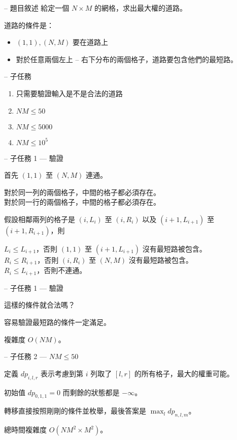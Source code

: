 \documentclass[hyperref,UTF8,notheorems,xcolor={dvipsnames}]{beamer}
\newcommand{\btitle}[1]{{\secname} -- #1}
\theoremstyle{definition}
\begin{document}
\begin{frame}[fragile]{\btitle{題目敘述}}
	給定一個 $N \times M$ 的網格，求出最大權的道路。  

	道路的條件是：
	\begin{itemize}
		\item $(1, 1), (N, M)$ 要在道路上
		\item 對於任意兩個左上 -- 右下分布的兩個格子，道路要包含他們的最短路。
	\end{itemize}
\end{frame}

\begin{frame}[fragile]{\btitle{子任務}}
	\begin{enumerate}
		\item 只需要驗證輸入是不是合法的道路
		\item $NM \leq 50$
		\item $NM \leq 5000$
		\item $NM \leq 10^5$
	\end{enumerate}
\end{frame}

\begin{frame}[fragile]{\btitle{子任務 1 --- 驗證}}
	
	首先 $(1, 1)$ 至 $(N, M)$ 連通。  

	{
		對於同一列的兩個格子，中間的格子都必須存在。\\  
		對於同一行的兩個格子，中間的格子都必須存在。  
	}

	{
		假設相鄰兩列的格子是 $(i, L_i)$ 至 $(i, R_i)$ 以及 $(i+1, L_{i+1})$ 至 $(i+1, R_{i+1})$，則  

		$L_i \leq L_{i+1}$，否則 $(1, 1)$ 至 $(i+1, L_{i+1})$ 沒有最短路被包含。\\
		$R_i \leq R_{i+1}$，否則 $(i, R_i)$ 至 $(N, M)$ 沒有最短路被包含。\\
		$R_i \leq L_{i+1}$，否則不連通。
	}

\end{frame}

\begin{frame}[fragile]{\btitle{子任務 1 --- 驗證}}
	
	這樣的條件就合法嗎？  

	容易驗證最短路的條件一定滿足。  

	複雜度 $O(NM)$。  

\end{frame}

\begin{frame}[fragile]{\btitle{子任務 2 --- $NM \leq 50$}}
	
	定義 $dp_{i, l, r}$ 表示考慮到第 $i$ 列取了 $[l, r]$ 的所有格子，最大的權重可能。  

	初始值 $dp_{0, 1, 1} = 0$ 而剩餘的狀態都是 $- \infty$。  

	轉移直接按照剛剛的條件並枚舉，最後答案是 $\max_{l} dp_{n,l,m}$。  

	總時間複雜度 $O(NM^2 \times M^2)$。  

\end{frame}
\end{document}
